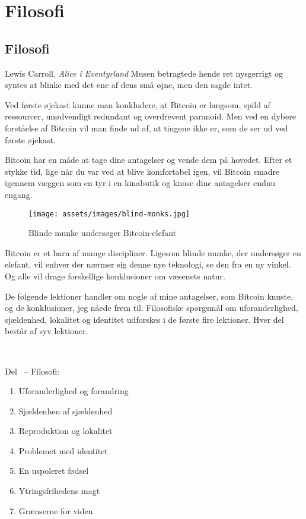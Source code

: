 \part{Filosofi}
\label{ch:filosofi}
\chapter*{Filosofi}

\begin{chapquote}{Lewis Carroll, \textit{Alice i Eventyrland}}
Musen betragtede hende ret nysgerrigt og syntes at blinke med det ene af dens 
små øjne, men den sagde intet.
\end{chapquote}

Ved første øjekast kunne man konkludere, at Bitcoin er langsom, spild af 
ressourcer, unødvendigt redundant og overdrevent paranoid. Men ved en dybere 
forståelse af Bitcoin vil man finde ud af, at tingene ikke er, som de ser ud 
ved første øjekast.

Bitcoin har en måde at tage dine antagelser og vende dem på hovedet. Efter et 
stykke tid, lige når du var ved at blive komfortabel igen, vil Bitcoin smadre 
igennem væggen som en tyr i en kinabutik og knuse dine antagelser endnu engang.

\begin{figure}[htbp]
  \centering
  \texttt{[image: assets/images/blind-monks.jpg]}
  \caption{Blinde munke undersøger Bitcoin-elefant}
  \label{fig:blind-monks}
\end{figure}

Bitcoin er et barn af mange discipliner. Ligesom blinde munke, der undersøger en 
elefant, vil enhver der nærmer sig denne nye teknologi, se den fra en ny 
vinkel. Og alle vil drage forskellige konklusioner om væsenets natur.

De følgende lektioner handler om nogle af mine antagelser, som Bitcoin knuste, 
og de konklusioner, jeg nåede frem til. Filosofiske spørgsmål om 
uforanderlighed, sjældenhed, lokalitet og identitet udforskes i de første fire 
lektioner. Hver del består af syv lektioner.

~

\begin{samepage}
Del~\ref{ch:filosofi} -- Filosofi:

\begin{enumerate}
  \item Uforanderlighed og forandring
  \item Sjældenhen af sjældenhed
  \item Reproduktion og lokalitet
  \item Problemet med identitet
  \item En uspoleret fødsel
  \item Ytringsfrihedens magt
  \item Grænserne for viden
\end{enumerate}
\end{samepage}

